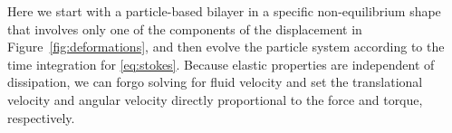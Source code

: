 %

Here we start with a particle-based bilayer in a specific
non-equilibrium shape that involves only one of the components of the
displacement in Figure~\ref{fig:deformations}, and then evolve the
particle system according to the time integration for \eqref{eq:stokes}.
Because elastic properties are independent of dissipation, we can forgo
solving for fluid velocity and set the translational velocity and
angular velocity directly proportional to the force and torque,
respectively. 
%


